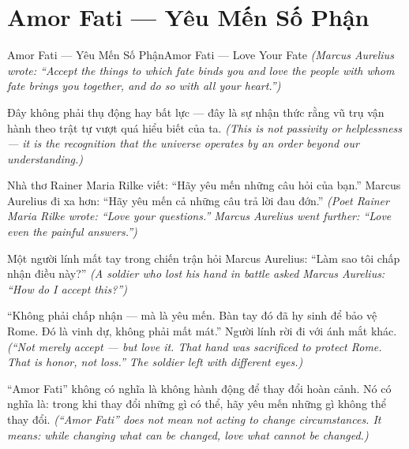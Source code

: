 \section{Amor Fati — Yêu Mến Số Phận}
\begin{truyen}{Amor Fati — Yêu Mến Số Phận}{Amor Fati — Love Your Fate}
\textit{(Marcus Aurelius wrote: ``Accept the things to which fate binds you and love the people with whom fate brings you together, and do so with all your heart.'')}

Đây không phải thụ động hay bất lực — đây là sự nhận thức rằng vũ trụ vận hành theo trật tự vượt quá hiểu biết của ta.
\textit{(This is not passivity or helplessness — it is the recognition that the universe operates by an order beyond our understanding.)}

Nhà thơ Rainer Maria Rilke viết: ``Hãy yêu mến những câu hỏi của bạn.'' Marcus Aurelius đi xa hơn: ``Hãy yêu mến cả những câu trả lời đau đớn.''
\textit{(Poet Rainer Maria Rilke wrote: ``Love your questions.'' Marcus Aurelius went further: ``Love even the painful answers.'')}

Một người lính mất tay trong chiến trận hỏi Marcus Aurelius: ``Làm sao tôi chấp nhận điều này?''
\textit{(A soldier who lost his hand in battle asked Marcus Aurelius: ``How do I accept this?'')}

``Không phải chấp nhận — mà là yêu mến. Bàn tay đó đã hy sinh để bảo vệ Rome. Đó là vinh dự, không phải mất mát.'' Người lính rời đi với ánh mắt khác.
\textit{(``Not merely accept — but love it. That hand was sacrificed to protect Rome. That is honor, not loss.'' The soldier left with different eyes.)}

\end{truyen}

\begin{baihoc}
``Amor Fati'' không có nghĩa là không hành động để thay đổi hoàn cảnh. Nó có nghĩa là: trong khi thay đổi những gì có thể, hãy yêu mến những gì không thể thay đổi.
\textit{(``Amor Fati'' does not mean not acting to change circumstances. It means: while changing what can be changed, love what cannot be changed.)}
\end{baihoc}
\ngancach


